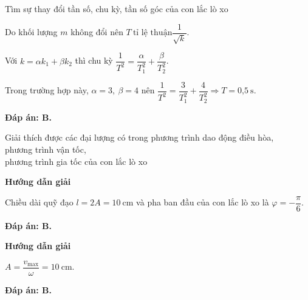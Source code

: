 \begin{dang}{Tìm sự thay đổi tần số, chu kỳ, tần số góc của con lắc lò xo}
{		Do khối lượng $m$ không đổi nên $T \ \text{tỉ lệ thuận}  \dfrac{1}{\sqrt{k}}$.
		
		Với $k=\alpha k_1+\beta k_2$ thì chu kỳ $\dfrac{1}{T^2}=\dfrac{\alpha}{T_1^2}+\dfrac{\beta}{T_2^2}$.
		
		Trong trường hợp này, $\alpha=3, \ \beta=4$ nên $\dfrac{1}{T^2}=\dfrac{3}{T_1^2}+\dfrac{4}{T_2^2}\Rightarrow T=\text{0,5}\ \text{s}$.
		
		\textbf{Đáp án: B.}
	}
\end{dang}

\begin{dang}{Giải thích được các đại lượng có trong phương trình dao động điều hòa,\\ phương trình vận tốc,\\ phương trình gia tốc của con lắc lò xo}
	
	{\begin{center}
			\textbf{Hướng dẫn giải}
		\end{center}
		
		Chiều dài quỹ đạo $l=2A=\text{10}\ \text{cm} $ và pha ban đầu của con lắc lò xo là $\varphi=-\dfrac{\pi}{6}$.		
		
		\textbf{Đáp án: B.}
	}
	{\begin{center}
			\textbf{Hướng dẫn giải}
		\end{center}
		
		$A=\dfrac{v_\text{max}}{\omega}=10\ \text{cm}$.
		
		\textbf{Đáp án: B.}
	}
	
	
\end{dang}
